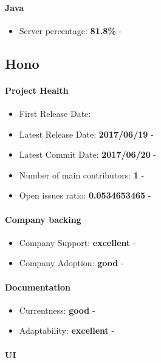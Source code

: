 \documentclass{article}
\begin{document}
\paragraph{Java} 

\begin{itemize}
\item Server percentage: \textbf{81.8\%} - 
\end{itemize}

\subsection{Hono}

\paragraph{Project Health}

\begin{itemize}
\item First Release Date: 
\item Latest Release Date: \textbf{2017/06/19} - 
\item Latest Commit Date: \textbf{2017/06/20} - 
\item Number of main contributors: \textbf{1} - 
\item Open issues ratio: \textbf{0.0534653465} - 
\end{itemize}

\paragraph{Company backing}

\begin{itemize}
\item Company Support: \textbf{excellent} - 
\item Company Adoption: \textbf{good} - 
\end{itemize}

\paragraph{Documentation}

\begin{itemize}
\item Currentness: \textbf{good} - 
\item Adaptability: \textbf{excellent} - 
\end{itemize}

\paragraph{UI}
\end{document}
